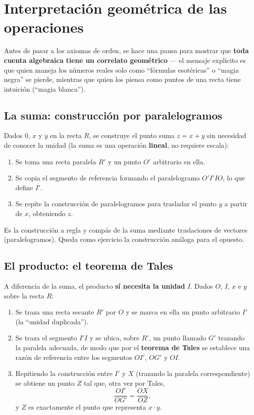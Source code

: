 \documentclass[12pt,a4paper]{article}
\begin{document}
\section{Interpretación geométrica de las operaciones}

Antes de pasar a los axiomas de orden, se hace una pausa para mostrar que
\textbf{toda cuenta algebraica tiene un correlato geométrico} --- el
mensaje explícito es que quien maneja los números reales solo como
``fórmulas esotéricas'' o ``magia negra'' se pierde, mientras que quien los
piensa como puntos de una recta tiene intuición (``magia blanca'').

\subsection{La suma: construcción por paralelogramos}

Dados $0$, $x$ y $y$ en la recta $R$, se construye el punto suma $z=x+y$ sin
necesidad de conocer la unidad (la suma es una operación \textbf{lineal},
no requiere escala):

\begin{enumerate}
  \item Se toma una recta paralela $R'$ y un punto $O'$ arbitrario en ella.
  \item Se copia el segmento de referencia formando el paralelogramo
    $O'I'IO$, lo que define $I'$.
  \item Se repite la construcción de paralelogramos para trasladar el
    punto $y$ a partir de $x$, obteniendo $z$.
\end{enumerate}

Es la construcción a regla y compás de la suma mediante traslaciones de
vectores (paralelogramos). Queda como ejercicio la construcción análoga
para el opuesto.

\subsection{El producto: el teorema de Tales}

A diferencia de la suma, el producto \textbf{sí necesita la unidad} $I$.
Dados $O$, $I$, $x$ e $y$ sobre la recta $R$:

\begin{enumerate}
  \item Se traza una recta secante $R'$ por $O$ y se marca en ella un
    punto arbitrario $I'$ (la ``unidad duplicada'').
  \item Se traza el segmento $I'I$ y se ubica, sobre $R'$, un punto llamado
    $G'$ trazando la paralela adecuada, de modo que por el
    \textbf{teorema de Tales} se establece una razón de referencia entre
    los segmentos $OI'$, $OG'$ y $OI$.
  \item Repitiendo la construcción entre $I'$ y $X$ (trazando la paralela
    correspondiente) se obtiene un punto $Z$ tal que, otra vez por Tales,
    \[
    \frac{OI'}{OG'} = \frac{OX}{OZ},
    \]
    y $Z$ es exactamente el punto que representa $x\cdot y$.
\end{enumerate}
\end{document}
